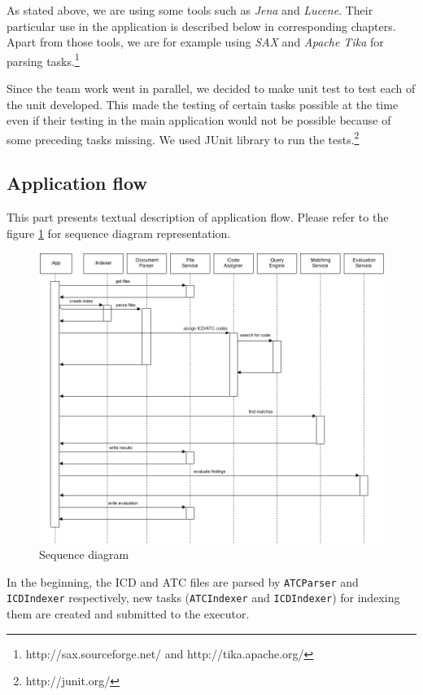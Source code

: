 \documentclass{article}
\begin{document}
As stated above, we are using some tools such as \emph{Jena} and \emph{Lucene}. Their particular use in the application is described below in corresponding chapters. Apart from those tools, we are for example using \emph{SAX} and \emph{Apache Tika} for parsing tasks.\footnote{http://sax.sourceforge.net/ and http://tika.apache.org/}

Since the team work went in parallel, we decided to make unit test to test each of the unit developed. This made the testing of certain tasks possible at the time even if their testing in the main application would not be possible because of some preceding tasks missing. We used JUnit library to run the tests.\footnote{http://junit.org/}

\subsection{Application flow}

This part presents textual description of application flow. Please refer to the figure \ref{fig:seq} for sequence diagram representation.

\begin{figure}[h!]
    \centering
    \includegraphics[width=1.0\textwidth]{seq}
    \caption{Sequence diagram}
    \label{fig:seq}
\end{figure}

In the beginning, the ICD and ATC files are parsed by \texttt{ATCParser} and \texttt{ICDIndexer} respectively, new tasks (\texttt{ATCIndexer} and \texttt{ICDIndexer}) for indexing  them are created and submitted to the executor.
\end{document}
